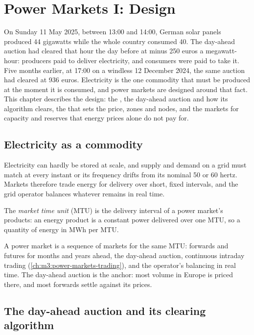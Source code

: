 \chapter{Power Markets I: Design}\label{ch:m3:power-markets-design}

On Sunday 11 May 2025, between 13:00 and 14:00, German solar panels produced 44
gigawatts while the whole country consumed 40. The day-ahead auction had cleared that
hour the day before at minus 250 euros a megawatt-hour: producers paid to deliver
electricity, and consumers were paid to take it. Five months earlier, at 17:00 on a
windless 12 December 2024, the same auction had cleared at 936 euros. Electricity is the one
commodity that must be produced at the moment it is consumed, and power markets are
designed around that fact. This chapter describes the design: the ,
the day-ahead auction and how its algorithm clears, the  that sets the
price, zones and nodes, and the markets for capacity and reserves that energy prices
alone do not pay for.

\section{Electricity as a commodity}

Electricity can hardly be stored at scale, and supply and demand on a grid must match
at every instant or its frequency drifts from its nominal 50 or 60 hertz. Markets
therefore trade energy for delivery over short, fixed intervals, and the grid operator
balances whatever remains in real time.

\begin{definition}\label{def:m3:power-markets-design:mtu}
The \emph{market time unit} (MTU) is the delivery interval of
a power market's products: an energy product is a constant power delivered over one
MTU, so a quantity of energy in MWh per MTU.
\end{definition}

A power market is a sequence of markets for the same MTU: forwards and futures for
months and years ahead, the day-ahead auction, continuous intraday trading
(\cref{ch:m3:power-markets-trading}), and the operator's balancing in real time. The
day-ahead auction is the anchor: most volume in Europe is priced there, and most
forwards settle against its prices.

\section{The day-ahead auction and its clearing algorithm}


